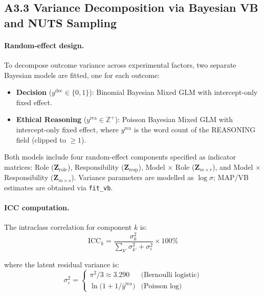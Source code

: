 \subsection*{A3.3 Variance Decomposition via Bayesian VB and NUTS Sampling}

\paragraph{Random-effect design.}
To decompose outcome variance across experimental factors, two separate Bayesian
models are fitted, one for each outcome:

\begin{itemize}[noitemsep]
    \item \textbf{Decision} ($y^{\text{dec}} \in \{0,1\}$): Binomial Bayesian Mixed GLM
          with intercept-only fixed effect.
    \item \textbf{Ethical Reasoning} ($y^{\text{rea}} \in \mathbb{Z}^+$): Poisson Bayesian
          Mixed GLM with intercept-only fixed effect, where $y^{\text{rea}}$ is the word
          count of the REASONING field (clipped to $\geq 1$).
\end{itemize}

Both models include four random-effect components specified as indicator matrices:
Role ($\mathbf{Z}_{\text{role}}$), Responsibility ($\mathbf{Z}_{\text{resp}}$),
Model $\times$ Role ($\mathbf{Z}_{m \times r}$), and
Model $\times$ Responsibility ($\mathbf{Z}_{m \times s}$).
Variance parameters are modelled as $\log\sigma$; MAP/VB estimates are obtained via
\texttt{fit\_vb}.

\paragraph{ICC computation.}
The intraclass correlation for component $k$ is:
\begin{equation}
    \text{ICC}_k = \frac{\sigma^2_k}{\sum_{k'}\sigma^2_{k'} + \sigma^2_{\varepsilon}}
    \times 100\%
\end{equation}

where the latent residual variance is:
\begin{equation}
    \sigma^2_{\varepsilon} =
    \begin{cases}
        \pi^2/3 \approx 3.290 & \text{(Bernoulli logistic)} \\[4pt]
        \ln\!\bigl(1 + 1/\bar{y}^{\text{rea}}\bigr) & \text{(Poisson log)}
    \end{cases}
\end{equation}

